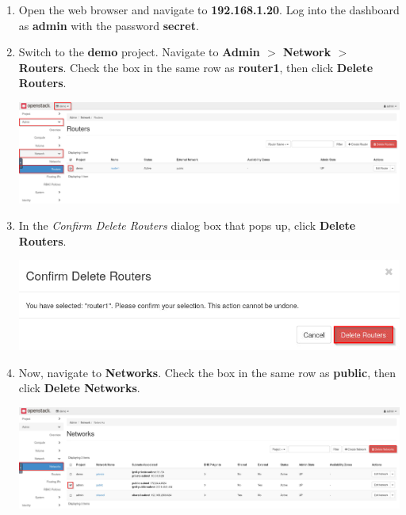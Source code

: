 \documentclass[letterpaper, 12pt]{article}
\begin{document}
\begin{enumerate}
    \item Open the web browser and navigate to \textbf{192.168.1.20}. Log into the dashboard as \textbf{admin} with the
    password \textbf{secret}.

    \item Switch to the \textbf{demo} project. Navigate to \textbf{Admin $>$ Network $>$ Routers}. Check the box in the
    same row as \textbf{router1}, then click \textbf{Delete Routers}.

    \begin{center}
        \includegraphics[width=\linewidth]{images/part1/step2.png}
    \end{center}

    \item In the \textit{Confirm Delete Routers} dialog box that pops up, click \textbf{Delete Routers}.

    \begin{center}
        \includegraphics[width=\linewidth]{images/part1/step3.png}
    \end{center}

    \item Now, navigate to \textbf{Networks}. Check the box in the same row as \textbf{public}, then click
    \textbf{Delete Networks}.

    \begin{center}
        \includegraphics[width=\linewidth]{images/part1/step4.png}
    \end{center}


\end{enumerate}
\end{document}
